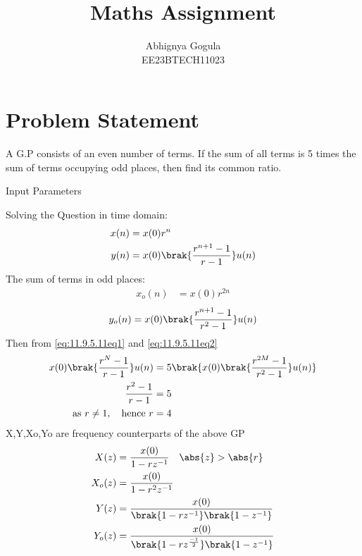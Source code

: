 \documentclass[journal,12pt,twocolumn]{IEEEtran}
\theoremstyle{remark}
\begin{document}

\title{Maths Assignment}
\author{Abhignya Gogula\\
        EE23BTECH11023}
\maketitle
\section*{Problem Statement}
A G.P consists of an even number of terms. If the sum of all terms is 5 times the sum of terms occupying odd places, then find its common ratio.\\
\solution
\fi
\begin{table}[h!]
\centering

\caption{Input Parameters}
\label{11.9.5.11tab1}
\end{table}
Solving the Question in time domain:
\begin{align}
x(n) &= x(0)r^{n} \\
y(n) &= x(0)\brak{\frac{r^{n+1}-1}{r-1}}u(n)
\label{eq:11.9.5.11eq1}
\end{align}
The sum of terms in odd places:
\begin{align}
x_o(n) &= x(0)r^{2n}
\end{align}
\begin{equation}
y_o(n)= x(0)\brak{\frac{r^{n+1}-1}{r^2-1}}u(n)
\label{eq:11.9.5.11eq2}
\end{equation}
Then from \eqref{eq:11.9.5.11eq1} and \eqref{eq:11.9.5.11eq2}
\begin{align}
x(0)\brak{\frac{r^{N}-1}{r-1}}u(n) &= 5\brak{x(0)\brak{\frac{r^{2M}-1}{r^2-1}}u(n)}\\
\frac{r^2-1}{r-1} &= 5\\
\text{as } r \neq 1, \quad \text{hence } r &= 4\\
\end{align}
X,Y,Xo,Yo are frequency counterparts of the above GP
\begin{align}
X(z) &= \frac{x(0)}{1-rz^{-1}} \quad \abs{z} > \abs{r}\\ 
X_o(z) &= \frac{x(0)}{1-r^{2}z^{-1}}\\
Y(z) &= \frac{x(0)}{\brak{1-rz^{-1}}\brak{1-z^{-1}}}\\
Y_o(z) &= \frac{x(0)}{\brak{1-rz^{\frac{-1}{2}}}\brak{1-z^{-1}}}
\end{align}
\end{document}
